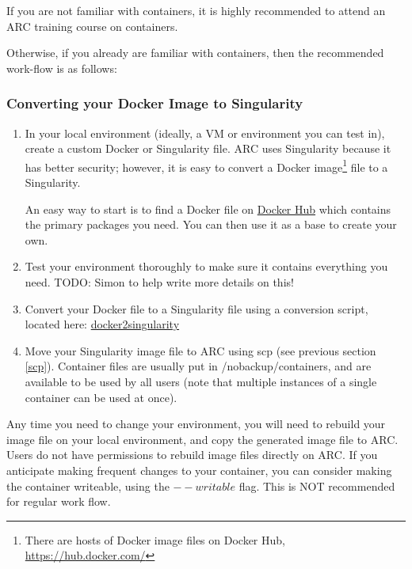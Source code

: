 \documentclass[]{article}
\begin{document}
If you are not familiar with containers, it is highly recommended to attend an ARC training course on containers. 

Otherwise, if you already are familiar with containers, then the recommended work-flow is as follows:
\subsubsection{Converting your Docker Image to Singularity}

\begin{enumerate}
	\item In your local environment (ideally, a VM or environment you can test in), create a custom Docker or Singularity file. ARC uses Singularity because it has better security; however, it is easy to convert a Docker image\footnote{There are hosts of Docker image files on Docker  Hub, \url{https://hub.docker.com/}} file to a Singularity.
	
	An easy way to start is to find a Docker file on \href{https://hub.docker.com/}{Docker Hub} which contains the primary packages you need. You can then use it as a base to create your own.
	
	\item Test your environment thoroughly to make sure it contains everything you need. TODO: Simon to help write more details on this!
	
	\item Convert your Docker file to a Singularity file using a conversion script, located here: \href{https://github.com/singularityware/docker2singularity}{docker2singularity}
	
	\item Move your Singularity image file to ARC using scp (see previous section \ref{scp}). Container files are usually put in /nobackup/containers, and are available to be used by all users (note that multiple instances of a single container can be used at once).
\end{enumerate}

Any time you need to change your environment, you will need to rebuild your image file on your local environment, and copy the generated image file to ARC. Users do not have permissions to rebuild image files directly on ARC. If you anticipate making frequent changes to your container, you can consider making the container writeable, using the \(--writable\) flag. This is NOT recommended for regular work flow.
\end{document}

